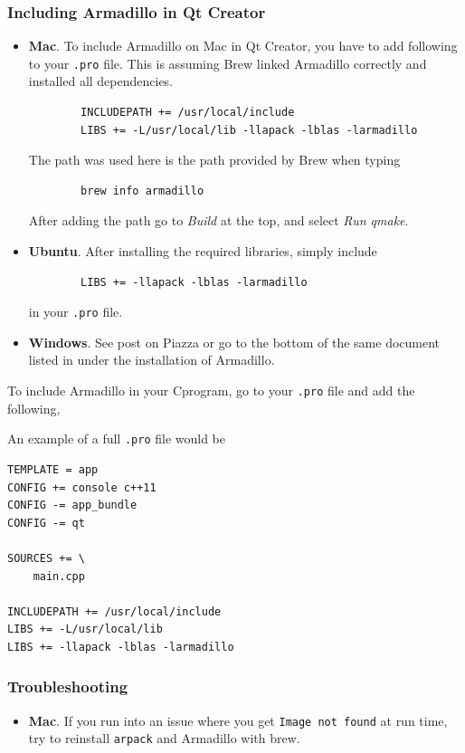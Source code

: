 \documentclass[11pt]{article}
\newcommand{\CC}{C\nolinebreak\hspace{-.05em}\raisebox{.4ex}{\tiny\bf +}\nolinebreak\hspace{-.10em}\raisebox{.4ex}{\tiny\bf +}}
\def\CC{{C\nolinebreak[4]\hspace{-.05em}\raisebox{.4ex}{\tiny\bf ++}}}
\begin{document}
\subsubsection{Including Armadillo in Qt Creator}
\begin{itemize}
    \item \textbf{Mac}. To include Armadillo on Mac in Qt Creator, you have to add following to your \texttt{.pro} file. This is assuming Brew linked Armadillo correctly and installed all dependencies.
    \begin{lstlisting}
        INCLUDEPATH += /usr/local/include
        LIBS += -L/usr/local/lib -llapack -lblas -larmadillo
    \end{lstlisting}
    The path was used here is the path provided by Brew when typing 
    \begin{lstlisting}
        brew info armadillo
    \end{lstlisting}
    After adding the path go to \textit{Build} at the top, and select \textit{Run qmake}.
    \item \textbf{Ubuntu}. After installing the required libraries, simply include
    \begin{lstlisting}
        LIBS += -llapack -lblas -larmadillo
    \end{lstlisting}
    in your \texttt{.pro} file.
    \item \textbf{Windows}. See post on Piazza or go to the bottom of the same document listed in under the installation of Armadillo.
\end{itemize}
To include Armadillo in your \CC program, go to your \texttt{.pro} file and add the following,

An example of a full \texttt{.pro} file would be
\begin{lstlisting}
TEMPLATE = app
CONFIG += console c++11
CONFIG -= app_bundle
CONFIG -= qt

SOURCES += \
    main.cpp

INCLUDEPATH += /usr/local/include
LIBS += -L/usr/local/lib 
LIBS += -llapack -lblas -larmadillo
\end{lstlisting}

\subsubsection{Troubleshooting}
\begin{itemize}
    \item \textbf{Mac}. If you run into an issue where you get \texttt{Image not found} at run time, try to reinstall \texttt{arpack} and Armadillo with brew. 
\end{itemize}
\end{document}
